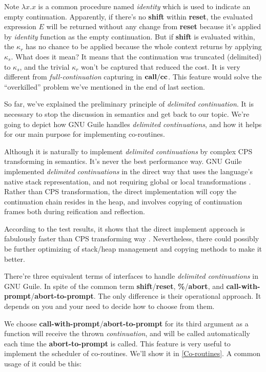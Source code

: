 \documentclass[numbers,numberedpars]{sigplanconf}
\begin{document}
Note $\lambda{x}.x$ is a common procedure named {\it identity} which is used to indicate an empty continuation.
Apparently, if there's no {\bf shift} within {\bf reset}, the evaluated expression $E$ will be returned without any change from {\bf reset} because
it's applied by {\it identity} function as the empty continuation. But if {\bf shift} is evaluated within, the $\kappa_r$ has no chance to
be applied because the whole context returns by applying $\kappa_s$. What does it mean? It means that the continuation was truncated (delimited) to
$\kappa_s$, and the trivial $\kappa_r$ won't be captured that reduced the cost. It is very different from {\it full-continuation} capturing in
${\bf call/cc}$. This feature would solve the ``overkilled'' problem we've mentioned in the end of last section.

So far, we've explained the preliminary principle of {\it delimited continuation}. It is necessary to stop the discussion in semantics and get back
to our topic. We're going to depict how GNU Guile handles {\it delimited continuations}, and how it helps for our main purpose for implementing
co-routines.

Although it is naturally to implement {\it delimited continuations} by complex CPS transforming in semantics. It's never the best performance way.
GNU Guile implemented {\it delimited continuations} in the direct way that uses the language's native stack representation, and not requiring global
or local transformations \citep{wingo2010}. Rather than CPS transformation, the direct implementation will copy the continuation chain resides in the
heap, and involves copying of continuation frames both during reification and reflection.

According to the test results, it shows that the direct implement approach is fabulously faster than CPS transforming way
\citep{Gasbichler:2002:FSC:581478.581504}. Nevertheless, there could possibly be further optimizing of stack/heap management and copying methods to make
it better.

There're three equivalent terms of interfaces to handle {\it delimited continuations} in GNU Guile. In spite of the common term {\bf shift}/{\bf reset},
{\bf \%}/{\bf abort}, and {\bf call-with-prompt}/{\bf abort-to-prompt}. The only difference is their operational approach. It depends on you and your
need to decide how to choose from them.

We choose {\bf call-with-prompt}/{\bf abort-to-prompt} for its third argument as a function will receive the thrown {\it continuation}, and will be
called automatically each time the {\bf abort-to-prompt} is called. This feature is very useful to implement the scheduler of co-routines. We'll show it
in \ref{Co-routines}. A common usage of it could be this:
\end{document}
